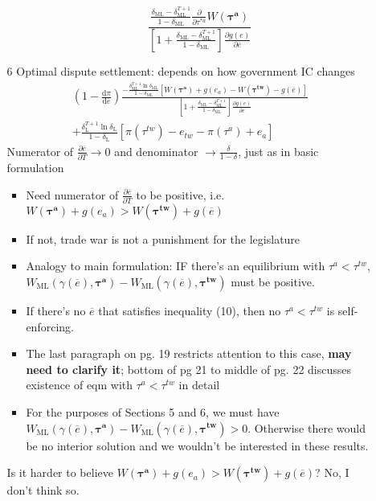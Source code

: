 \documentclass[12pt]{article}
\newcommand{\ov}{\overline}
\newcommand{\bta}{\bm{\tau^a}}
\newcommand{\btw}{\bm{\tau^{tw}}}
\newcommand{\ga}{\gamma}
\newcommand{\de}{\delta}
\begin{document}
\begin{itemize}
\begin{itemize}
\begin{itemize}
\begin{equation*}
	\textstyle \frac{\frac{\de_\text{ML} - \de_\text{ML}^{T+1}}{1-\de_\text{ML}}  \frac{\partial}{\partial \tau^{*a}}W(\bta)}{\left[1+\frac{\de_\text{ML} - \de_\text{ML}^{T+1}}{1-\de_\text{ML}}\right] \frac{\partial g(e)}{\partial \ov{e}} }
							\end{equation*}
				\end{itemize}
			\item[6] Optimal dispute settlement: depends on how government IC changes
			  \begin{multline}
					\left(1 - \frac{\mathrm{d} \pi}{\mathrm{d} \ov{e}} \right) \frac{ -\frac{\de_\text{ML}^{T+1}\ln\de_\text{ML}}{1-\de_\text{ML}}\left[  W(\bta) +g(e_a) - W(\btw) - g(\ov{e}) \right]}{\left[ 1 + \frac{\de_\text{ML} - \de_\text{ML}^{T+1}}{1-\de_\text{ML}} \right] \frac{\partial g(e)}{\partial e} } \\
	+  \frac{\de_\text{L}^{T+1} \ln \de_\text{L}}{1-\de_\text{L}} \left[ \pi(\tau^{tw}) - e_{tw} -\pi(\tau^a) + e_a \right]
				\end{multline}
				Numerator of $\frac{\partial \ov{e}}{\partial T} \rightarrow 0$ and denominator $\rightarrow \frac{\de}{1-\de}$, just as in basic formulation
				\begin{itemize}
					\item Need numerator of $\frac{\partial \ov{e}}{\partial T}$ to be positive, i.e. $W(\bta) +g(e_a) > W(\btw) + g(\ov{e})$
					\item If not, trade war is not a punishment for the legislature
					\item Analogy to main formulation: IF there's an equilibrium with $\tau^a < \tau^{tw}$, $W_\text{ML}(\ga(\ov{e}),\bta) - W_\text{ML}(\ga(\ov{e}),\btw)$ must be positive.
					\item If there's no $\ov{e}$ that satisfies inequality (10), then no $\tau^a < \tau^{tw}$ is self-enforcing.
					\item The last paragraph on pg. 19 restricts attention to this case, \textbf{may need to clarify it}; bottom of pg 21 to middle of pg. 22 discusses existence of eqm with $\tau^a < \tau^{tw}$ in detail
					\item For the purposes of Sections 5 and 6, we must have $W_\text{ML}(\ga(\ov{e}),\bta) - W_\text{ML}(\ga(\ov{e}),\btw) > 0$. Otherwise there would be no interior solution and we wouldn't be interested in these results.
				\end{itemize}
			Is it harder to believe $W(\bta) +g(e_a) > W(\btw) + g(\ov{e})$? No, I don't think so.
				\begin{itemize}

\end{itemize}
\end{itemize}
\end{itemize}
\end{document}
